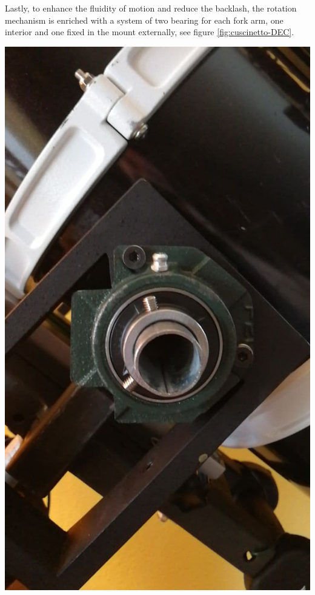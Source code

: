 \documentclass{article}
\begin{document}
\begin{multicols}{2}
        Lastly, to enhance the fluidity of motion and reduce the backlash, the rotation mechanism is enriched with a system of two bearing for each fork arm, one interior and one fixed in the mount externally, see figure \ref{fig:cuscinetto-DEC}.
        \\
        \begin{minipage}
            {.5\textwidth}
            \centering
            \includegraphics[scale=.45]{cuscinetto-dec.jpg}
            \label{fig:cuscinetto-DEC}
        \end{minipage}



\end{multicols}
\end{document}
